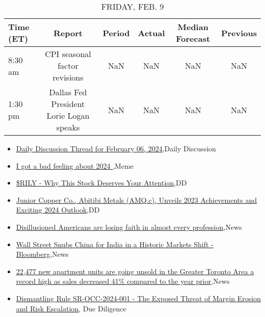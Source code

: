 \documentclass{article}%
\begin{document}
%


\begin{table}[htbp]%
\caption{FRIDAY, FEB. 9}%
\centering%
\begin{adjustbox}{width=1\textwidth}%
\begin{tabular}{lccccc}
\toprule
Time (ET) &                                  Report & Period & Actual & Median Forecast & Previous \\
\midrule
  8:30 am &           CPI seasonal factor revisions &    NaN &    NaN &             NaN &      NaN \\
  1:30 pm & Dallas Fed President Lorie Logan speaks &    NaN &    NaN &             NaN &      NaN \\
\bottomrule
\end{tabular}
%
\end{adjustbox}%
\end{table}

%
\begin{itemize}%
\item%
\href{https://reddit.com/r/wallstreetbets/comments/1ak76kh/daily\_discussion\_thread\_for\_february\_06\_2024/}{Daily Discussion Thread for February 06, 2024},Daily Discussion%
\item%
\href{https://reddit.com/r/wallstreetbets/comments/1ak68sm/i\_got\_a\_bad\_feeling\_about\_2024/}{I got a bad feeling about 2024 },Meme%
\item%
\href{https://reddit.com/r/wallstreetbets/comments/1ak5vxw/rily\_why\_this\_stock\_deserves\_your\_attention/}{\$RILY - Why This Stock Deserves Your Attention},DD%
\item%
\href{https://reddit.com/r/Baystreetbets/comments/1ajwd7q/junior\_copper\_co\_abitibi\_metals\_amqc\_unveils\_2023/}{Junior Copper Co., Abitibi Metals (AMQ.c), Unveils 2023 Achievements and Exciting 2024 Outlook},DD%
\item%
\href{https://reddit.com/r/Economics/comments/1ak6vit/disillusioned\_americans\_are\_losing\_faith\_in/}{Disillusioned Americans are losing faith in almost every profession},News%
\item%
\href{https://reddit.com/r/Economics/comments/1ak21ij/wall\_street\_snubs\_china\_for\_india\_in\_a\_historic/}{Wall Street Snubs China for India in a Historic Markets Shift - Bloomberg},News%
\item%
\href{https://reddit.com/r/Economics/comments/1ajtplq/22477\_new\_apartment\_units\_are\_going\_unsold\_in\_the/}{22,477 new apartment units are going unsold in the Greater Toronto Area  a record high as sales decreased 41\% compared to the year prior},News%
\item%
\href{https://reddit.com/r/Superstonk/comments/1ak549e/dismantling\_rule\_srocc2024001\_the\_exposed\_threat/}{Dismantling Rule SR-OCC-2024-001 - The Exposed Threat of Margin Erosion and Risk Escalation}, Due Diligence%
\end{itemize}%
\end{document}

